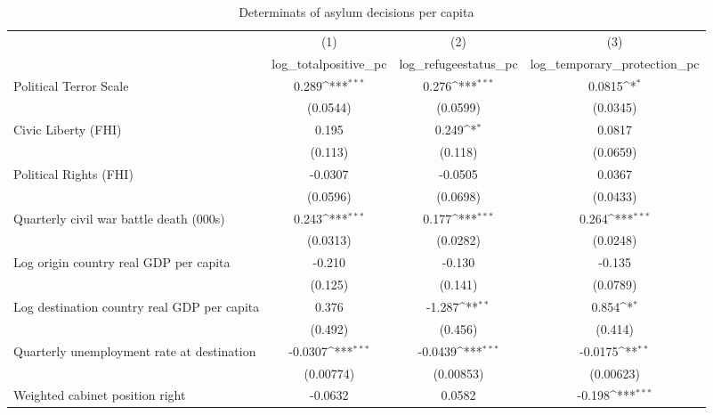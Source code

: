 \begin{table}[htbp]\centering
\def\sym#1{\ifmmode^{#1}\else\(^{#1}\)\fi}
\caption{Determinats of asylum decisions per capita}
\begin{tabular}{l*{3}{c}}
\hline\hline
                    &\multicolumn{1}{c}{(1)}&\multicolumn{1}{c}{(2)}&\multicolumn{1}{c}{(3)}\\
                    &\multicolumn{1}{c}{log\_totalpositive\_pc}&\multicolumn{1}{c}{log\_refugeestatus\_pc}&\multicolumn{1}{c}{log\_temporary\_protection\_pc}\\
\hline
Political Terror Scale&       0.289\sym{***}&       0.276\sym{***}&      0.0815\sym{*}  \\
                    &    (0.0544)         &    (0.0599)         &    (0.0345)         \\
[1em]
Civic Liberty (FHI) &       0.195         &       0.249\sym{*}  &      0.0817         \\
                    &     (0.113)         &     (0.118)         &    (0.0659)         \\
[1em]
Political Rights (FHI)&     -0.0307         &     -0.0505         &      0.0367         \\
                    &    (0.0596)         &    (0.0698)         &    (0.0433)         \\
[1em]
Quarterly civil war battle death (000s)&       0.243\sym{***}&       0.177\sym{***}&       0.264\sym{***}\\
                    &    (0.0313)         &    (0.0282)         &    (0.0248)         \\
[1em]
Log origin country real GDP per capita&      -0.210         &      -0.130         &      -0.135         \\
                    &     (0.125)         &     (0.141)         &    (0.0789)         \\
[1em]
Log destination country real GDP per capita&       0.376         &      -1.287\sym{**} &       0.854\sym{*}  \\
                    &     (0.492)         &     (0.456)         &     (0.414)         \\
[1em]
Quarterly unemployment rate at destination&     -0.0307\sym{***}&     -0.0439\sym{***}&     -0.0175\sym{**} \\
                    &   (0.00774)         &   (0.00853)         &   (0.00623)         \\
[1em]
Weighted cabinet position right&     -0.0632         &      0.0582         &      -0.198\sym{***}\\

\end{tabular}
\end{table}
